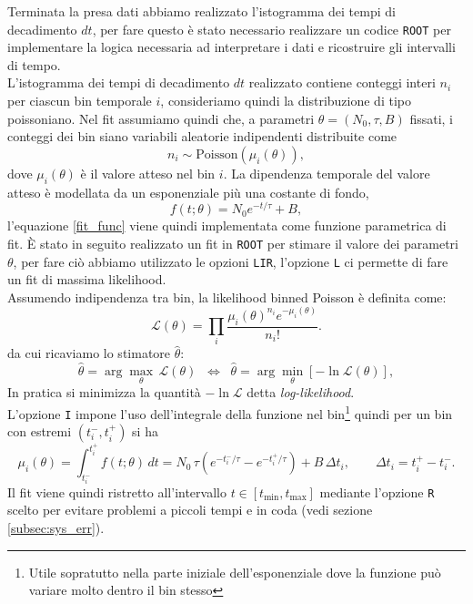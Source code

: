 \documentclass[10pt,a4paper]{article}
\begin{document}
\begin{flushleft}
    
Terminata la presa dati abbiamo realizzato l'istogramma dei tempi di decadimento $dt$, per fare questo è stato necessario realizzare un codice \texttt{ROOT} per implementare la logica necessaria ad interpretare i dati e ricostruire gli intervalli di tempo.\\
L’istogramma dei tempi di decadimento $d t$ realizzato contiene conteggi interi $n_i$ per ciascun bin temporale $i$, consideriamo quindi la distribuzione di tipo poissoniano. Nel fit assumiamo quindi che, a parametri $\theta=(N_0,\tau,B)$ fissati, i conteggi dei bin siano variabili aleatorie indipendenti distribuite come
\begin{equation}
n_i \sim \mathrm{Poisson}\!\left(\mu_i(\theta)\right),
\end{equation}
dove $\mu_i(\theta)$ è il valore atteso nel bin $i$. La dipendenza temporale del valore atteso è modellata da un esponenziale più una costante di fondo,
\begin{equation}
\label{fit_func}
f(t;\theta)=N_0 e^{-t/\tau}+B,
\end{equation}
l'equazione \ref{fit_func} viene quindi implementata come funzione parametrica di fit. È stato in seguito realizzato un fit in \texttt{ROOT} per stimare il valore dei parametri $\theta$, per fare ciò abbiamo utilizzato le opzioni \texttt{LIR}, l'opzione \texttt{L} ci permette di fare un fit di massima likelihood.\\
Assumendo indipendenza tra bin, la likelihood binned Poisson è definita come:
\begin{equation}
\label{eq:likelihood}
\mathcal{L}(\theta)=\prod_i \frac{\mu_i(\theta)^{n_i}e^{-\mu_i(\theta)}}{n_i!}.
\end{equation}
da cui ricaviamo lo stimatore $\hat{\theta}$:
\begin{equation}
\label{eq:max_like}
\hat{\theta}=\arg\max_{\theta}\,\mathcal{L}(\theta)
\;\;\Leftrightarrow\;\;
\hat{\theta}=\arg\min_{\theta}\left[-\ln\mathcal{L}(\theta)\right],
\end{equation}
In pratica si minimizza la quantità $-\ln\mathcal{L}$ detta \textit{log-likelihood}.\\
L’opzione \texttt{I} impone l’uso dell’integrale della funzione nel bin\footnote{Utile sopratutto nella parte iniziale dell'esponenziale dove la funzione può variare molto dentro il bin stesso} quindi per un bin con estremi $(t_i^{-},t_i^{+})$ si ha
\begin{equation}
\label{eq:val_medio}
\mu_i(\theta)=\int_{t_i^{-}}^{t_i^{+}} f(t;\theta)\,dt
= N_0\,\tau\left(e^{-t_i^{-}/\tau}-e^{-t_i^{+}/\tau}\right) + B\,\Delta t_i,
\qquad \Delta t_i=t_i^{+}-t_i^{-}.
\end{equation}
Il fit viene quindi ristretto all’intervallo $t\in[t_{\min},t_{\max}]$ mediante l'opzione \texttt{R}  scelto per evitare problemi a piccoli tempi e in coda (vedi sezione \ref{subsec:sys_err}). \\


\end{flushleft}
\end{document}

